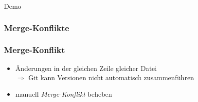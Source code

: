 \documentclass[accentcolor=tud8b,colorbacktitle,inverttitle,landscape,german,presentation,t]{tudbeamer}
\begin{document}
		\begin{frame}
			Demo
		\end{frame}
			
		\subsubsection{Merge-Konflikte}
			\begin{frame}
				\frametitle{Merge-Konflikt}
					\begin{itemize}
						\item Änderungen in der gleichen Zeile gleicher Datei\\
						$\Rightarrow$ Git kann Versionen nicht automatisch zusammenführen
						\item manuell \textit{Merge-Konflikt} beheben
					\end{itemize}
			\end{frame}
			
\end{document}
